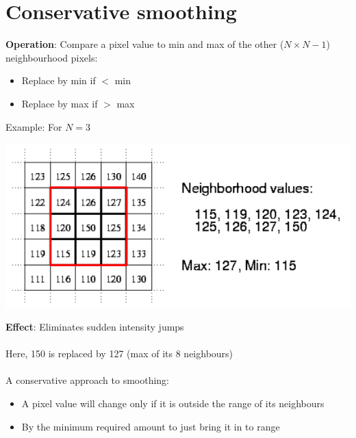 \documentclass{article}[18pt]
\begin{document}
\section{Conservative smoothing}
\textbf{Operation}: Compare a pixel value to min and max of the other ($N\times N -1$) neighbourhood pixels:
\begin{itemize}
	\item Replace by min if $<$ min
	\item Replace by max if $>$ max
\end{itemize}
Example: For $N=3$
\begin{center}
	\includegraphics[scale=0.7]{Smoothing}
\end{center}
\textbf{Effect}: Eliminates sudden intensity jumps\\
\\
Here, 150 is replaced by 127 (max of its 8 neighbours)\\
\\
A conservative approach to smoothing:
\begin{itemize}
	\item A pixel value will change only if it is outside the range of its neighbours
	\item By the minimum required amount to just bring it in to range
\end{itemize}
\end{document}
